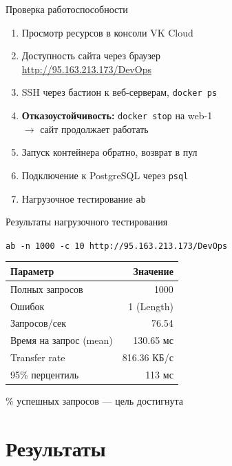 \documentclass[10pt,aspectratio=169]{beamer}
\begin{document}
\begin{frame}{Проверка работоспособности}

  \begin{enumerate}
    \item Просмотр ресурсов в консоли VK Cloud
    \item Доступность сайта через браузер \\
          \hfill\url{http://95.163.213.173/DevOps}
    \item SSH через бастион к веб-серверам, \texttt{docker ps}
    \item \textbf{Отказоустойчивость:} \texttt{docker stop} на web-1 \\
          \hfill$\rightarrow$ сайт продолжает работать
    \item Запуск контейнера обратно, возврат в пул
    \item Подключение к PostgreSQL через \texttt{psql}
    \item Нагрузочное тестирование \texttt{ab}
  \end{enumerate}
\end{frame}

\begin{frame}{Результаты нагрузочного тестирования}

  \centering
  \texttt{ab -n 1000 -c 10 http://95.163.213.173/DevOps}

  \vspace{0.3cm}
  \begin{tabular}{lr}
    \toprule
    \textbf{Параметр} & \textbf{Значение} \\
    \midrule
   Полных запросов & 1000 \\
   Ошибок & 1 (Length) \\
   Запросов/сек & 76.54 \\
   Время на запрос (mean) & 130.65 мс \\
   Transfer rate & 816.36 КБ/с \\
   95\% перцентиль & 113 мс \\
    \bottomrule
  \end{tabular}

  \vspace{0.3cm}
  \begin{exampleblock}{\% успешных запросов --- цель достигнута}
  \end{exampleblock}
\end{frame}

\section{Результаты}
\end{document}
